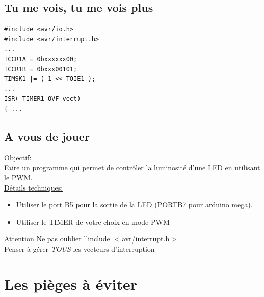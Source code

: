 \documentclass{beamer}
\def\Pause{2}
\begin{document}
\subsection{Tu me vois, tu me vois plus}

\lstset{language=c++} 
\lstset{commentstyle=\textit} 
\begin{lstlisting}
#include <avr/io.h>
#include <avr/interrupt.h>
...
TCCR1A = 0bxxxxxx00;
TCCR1B = 0bxxx00101;
TIMSK1 |= ( 1 << TOIE1 );
...
ISR( TIMER1_OVF_vect)
{ ...
\end{lstlisting}

\subsection{A vous de jouer}

\begin{frame}
  \underline{Objectif:}\\
  Faire un programme qui permet de contr\^oler la luminosit\'e d'une LED en utilisant le PWM.\\
\ifthenelse{\equal{\Pause}{1}}
{
  \pause
}{}
  \underline{D\'etails techniques:}\\
  \begin{itemize}
\ifthenelse{\equal{\Pause}{1}}
{
  \pause
}{}
    \item Utiliser le port B5 pour la sortie de la LED (PORTB7 pour arduino mega).
\ifthenelse{\equal{\Pause}{1}}
{
  \pause
}{}
    \item Utiliser le TIMER de votre choix en mode PWM
  \end{itemize}

\ifthenelse{\equal{\Pause}{1}}
{
  \pause
}{}
  \begin{alertblock}{Attention}
    Ne pas oublier l'include $<$avr/interrupt.h$>$\\
    Penser \`a g\'erer \emph{TOUS} les vecteurs d'interruption
  \end{alertblock}
\end{frame}

\section{Les pi\`eges \`a \'eviter}
\end{document}

